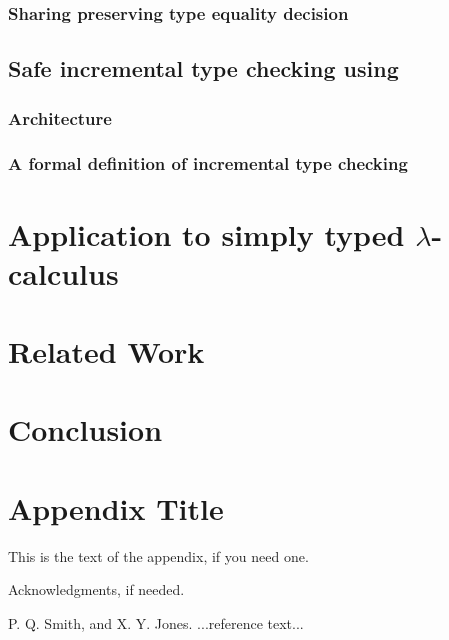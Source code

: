 \documentclass[preprint,9pt,authoryear]{sigplanconf}
\begin{document}
\subsubsection{Sharing preserving type equality decision}

\subsection{Safe incremental type checking using {\system}}

\subsubsection{Architecture}

\subsubsection{A formal definition of incremental type checking}

\section{Application to simply typed $\lambda$-calculus}

\section{Related Work}

\section{Conclusion}

\appendix
\section{Appendix Title}

This is the text of the appendix, if you need one.

\acks

Acknowledgments, if needed.





\begin{thebibliography}{}
\softraggedright

P. Q. Smith, and X. Y. Jones. ...reference text...

\end{thebibliography}
\end{document}
